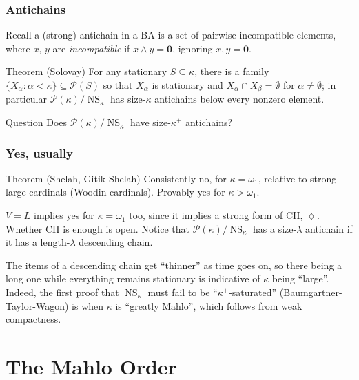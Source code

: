 \documentclass{beamer}
\newcommand{\NS}{\operatorname{NS}}
\begin{document}
\begin{frame}
\frametitle{Antichains}
Recall a (strong) antichain in a BA is a set of pairwise incompatible elements, where $x$, $y$ are \emph{incompatible} if $x \land y = \mathbf{0}$, ignoring $x, y = \mathbf{0}$.

\begin{block}{Theorem}
(Solovay) For any stationary $S \subseteq \kappa$, there is a family $\{X_\alpha: \alpha < \kappa\} \subseteq \mathcal{P}(S)$ so that $X_\alpha$ is stationary and $X_\alpha \cap X_\beta = \emptyset$ for $\alpha \neq \emptyset$; in particular $\mathcal{P}(\kappa)/\NS_\kappa$ has size-$\kappa$ antichains below every nonzero element.
\end{block}
\pause
\begin{block}{Question}
Does $\mathcal{P}(\kappa)/\NS_\kappa$ have size-$\kappa^+$ antichains?
\end{block}
\end{frame}

\begin{frame}
\frametitle{Yes, usually}
\begin{block}{Theorem}
(Shelah, Gitik-Shelah) Consistently no, for $\kappa = \omega_1$, relative to strong large cardinals (Woodin cardinals). Provably yes for $\kappa > \omega_1$.
\end{block}
\pause
$V = L$ implies yes for $\kappa = \omega_1$ too, since it implies a strong form of CH, $\lozenge$. Whether CH is enough is \alert{open}. Notice that $\mathcal{P}(\kappa)/\NS_\kappa$ has a size-$\lambda$ antichain if it has a length-$\lambda$ descending chain. \pause

The items of a descending chain get ``thinner'' as time goes on, so there being a long one while everything remains stationary is indicative of $\kappa$ being ``large''. Indeed, the first proof that $\NS_\kappa$ must fail to be ``$\kappa^+$-saturated'' (Baumgartner-Taylor-Wagon) is when $\kappa$ is ``\alert{greatly Mahlo}'', which follows from weak compactness.
\end{frame}

\section{The Mahlo Order}
\end{document}
